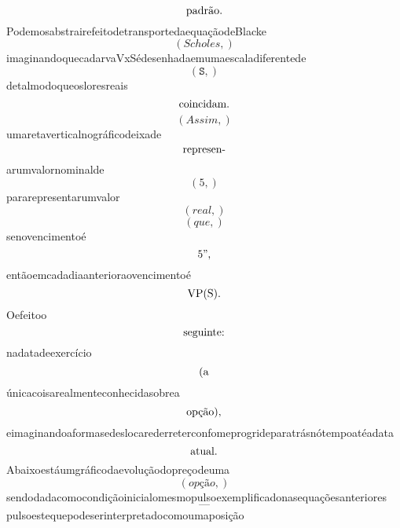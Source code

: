 \documentclass{article}
\begin{document}
\begin{equation}
$padrão.$
\end{equation}PodemosabstrairefeitodetransportedaequaçãodeBlacke\begin{equation}
\left( Scholes,\right)
\end{equation}imaginandoquecadarvaVxSédesenhadaemumaescaladiferentede\begin{equation}
\left( \mathtt{\text{S}},\right)
\end{equation}detalmodoqueosloresreais\begin{equation}
$coincidam.$
\end{equation}\begin{equation}
\left( Assim,\right)
\end{equation}umaretaverticalnográficodeixade\begin{equation}
$represen-$
\end{equation}arumvalornominalde\begin{equation}
\left( 5,\right)
\end{equation}pararepresentarumvalor\begin{equation}
\left( real,\right)
\end{equation}\begin{equation}
\left( que,\right)
\end{equation}senovencimentoé\begin{equation}
$5”,$
\end{equation}entãoemcadadiaanterioraovencimentoé\begin{equation}
$VP(S).$
\end{equation}Oefeitoo\begin{equation}
$seguinte:$
\end{equation}nadatadeexercício\begin{equation}
$(a$
\end{equation}únicacoisarealmenteconhecidasobrea\begin{equation}
$opção),$
\end{equation}eimaginandoaformasedeslocarederreterconfomeprogrideparatrásnótempoatéadata\begin{equation}
$atual.$
\end{equation}Abaixoestáumgráficodaevoluçãodopreçodeuma\begin{equation}
\left( opção,\right)
\end{equation}sendodadacomocondiçãoinicialomesmopulsoexemplificadonasequaçõesanteriores\begin{equation}
—
\end{equation}pulsoestequepodeserinterpretadocomoumaposição\begin{equation}

\end{equation}
\end{document}
